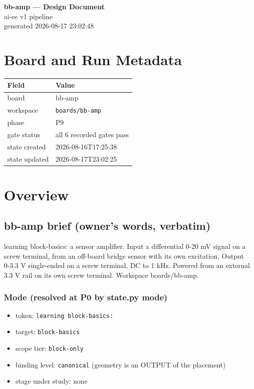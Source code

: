\documentclass[11pt,a4paper]{article}
\begin{document}
\sloppy
\begin{center}
{\LARGE\bfseries bb-amp --- Design Document}\\[6pt]
{\large ai-ee v1 pipeline}\\[2pt]
generated 2026-08-17 23:02:48
\end{center}
\tableofcontents

\section{Board and Run Metadata}
{\small
\begin{longtable}{lp{11cm}}
\toprule
\textbf{Field} & \textbf{Value} \\
\midrule
\endhead
board & bb-amp \\
workspace & \texttt{boards/bb-amp} \\
phase & P9 \\
gate status & all 6 recorded gates pass \\
state created & 2026-08-16T17:25:38 \\
state updated & 2026-08-17T23:02:25 \\
\bottomrule
\end{longtable}
}
\section{Overview}
\subsection*{bb-amp brief (owner's words, verbatim)}
learning block-basics: a sensor amplifier. Input a differential 0-20 mV signal on a screw terminal, from an off-board bridge sensor with its own excitation. Output 0-3.3 V single-ended on a screw terminal, DC to 1 kHz. Powered from an external 3.3 V rail on its own screw terminal. Workspace boards/bb-amp.

\subsubsection*{Mode (resolved at P0 by state.py mode)}
\begin{itemize}
\item token: \texttt{learning block-basics:}
\item target: \texttt{block-basics}
\item scope tier: \texttt{block-only}
\item binding level: \texttt{canonical} (geometry is an OUTPUT of the placement)
\item stage under study: none
\end{itemize}
\end{document}
